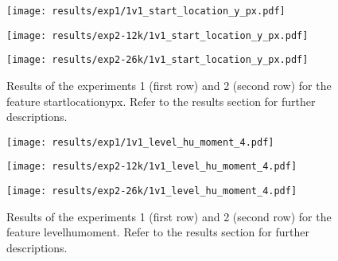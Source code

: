 \begin{figure}[h!]
	\centering
	\begin{minipage}{0.4\linewidth}
		\texttt{[image: results/exp1/1v1\_start\_location\_y\_px.pdf]}
	\end{minipage}
	
	\begin{minipage}{0.4\linewidth}
		\texttt{[image: results/exp2-12k/1v1\_start\_location\_y\_px.pdf]}
	\end{minipage}
	\begin{minipage}{0.4\linewidth}
		\texttt{[image: results/exp2-26k/1v1\_start\_location\_y\_px.pdf]}
	\end{minipage}
	
	\caption[ Results: Feature start\textunderscore location\textunderscore y\textunderscore px]{ Results of the experiments 1 (first row) and 2 (second row) for the feature start\textunderscore location\textunderscore y\textunderscore px. Refer to the results section for further descriptions. }
	\label{fig:appendix_start_location_y_px}
\end{figure}

\begin{figure}[h!]
	\centering
	\begin{minipage}{0.4\linewidth}
		\texttt{[image: results/exp1/1v1\_level\_hu\_moment\_4.pdf]}
	\end{minipage}
	
	\begin{minipage}{0.4\linewidth}
		\texttt{[image: results/exp2-12k/1v1\_level\_hu\_moment\_4.pdf]}
	\end{minipage}
	\begin{minipage}{0.4\linewidth}
		\texttt{[image: results/exp2-26k/1v1\_level\_hu\_moment\_4.pdf]}
	\end{minipage}
	
	\caption[ Results: Feature level\textunderscore hu\textunderscore moment]{ Results of the experiments 1 (first row) and 2 (second row) for the feature level\textunderscore hu\textunderscore moment. Refer to the results section for further descriptions. }
	\label{fig:appendix_level_hu_moment_4}
\end{figure}
\newpage 


